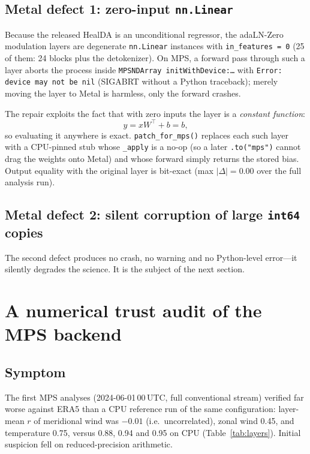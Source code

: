 \documentclass[twocolumn,11pt]{article}
\begin{document}
\subsection{Metal defect 1: zero-input \texttt{nn.Linear}}
Because the released HealDA is an unconditional regressor, the
adaLN-Zero modulation layers are degenerate
\texttt{nn.Linear} instances with \texttt{in\_features = 0} (25 of
them: 24 blocks plus the detokenizer). On MPS, a forward pass through
such a layer aborts the process inside
\texttt{MPSNDArray initWithDevice:\ldots} with
\texttt{Error: device may not be nil} (SIGABRT without a Python
traceback); merely moving the layer to Metal is harmless, only the
forward crashes.

The repair exploits the fact that with zero inputs the layer is a
\emph{constant function}:
\begin{equation}
y = xW^{\top} + b = b ,
\end{equation}
so evaluating it anywhere is exact. \texttt{patch\_for\_mps()}
replaces each such layer with a CPU-pinned stub whose
\texttt{\_apply} is a no-op (so a later \texttt{.to("mps")} cannot
drag the weights onto Metal) and whose forward simply returns the
stored bias. Output equality with the original layer is bit-exact
(max $|\Delta| = 0.00$ over the full analysis run).

\subsection{Metal defect 2: silent corruption of large
\texttt{int64} copies}
The second defect produces no crash, no warning and no Python-level
error---it silently degrades the science. It is the subject of the
next section.

\section{A numerical trust audit of the MPS backend}\label{sec:trust}

\subsection{Symptom}
The first MPS analyses (2024-06-01\,00\,UTC, full conventional
stream) verified far worse against ERA5 than a CPU reference run of
the same configuration: layer-mean $r$ of meridional wind was
$-0.01$ (i.e.\ uncorrelated), zonal wind 0.45, and temperature 0.75,
versus 0.88, 0.94 and 0.95 on CPU (Table~\ref{tab:layers}). Initial
suspicion fell on reduced-precision arithmetic.
\end{document}
